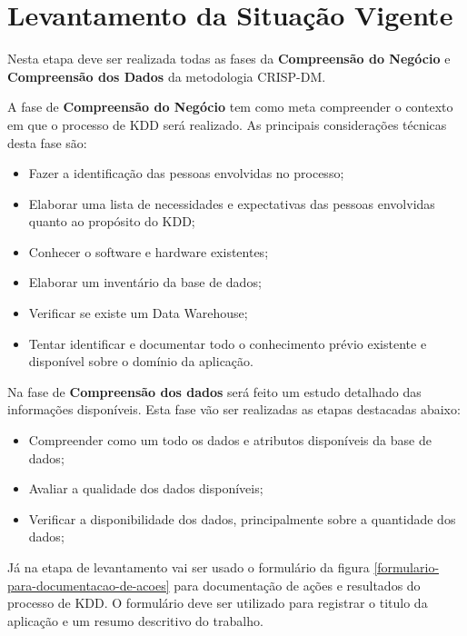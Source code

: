 \documentclass[diss-proposta,nocipinfo]{texufpel}
\begin{document}
\section{Levantamento da Situação Vigente}
\label{sec:levantamento-da-situacao-vigente}

Nesta etapa deve ser realizada todas as fases da \textbf{Compreensão do Negócio} e \textbf{Compreensão dos Dados} da metodologia CRISP-DM. 

A fase de \textbf{Compreensão do Negócio} tem como meta compreender o contexto em que o processo de KDD será realizado. As principais considerações técnicas desta fase são:
\begin{itemize}
\item Fazer a identificação das pessoas envolvidas no processo;
\item Elaborar uma lista de necessidades e expectativas das pessoas envolvidas quanto ao propósito do KDD;
\item Conhecer o software e hardware existentes;
\item Elaborar um inventário da base de dados;
\item Verificar se existe um Data Warehouse;
\item Tentar identificar e documentar todo o conhecimento prévio existente e disponível sobre o domínio da aplicação.
\end{itemize}

Na fase de \textbf{Compreensão dos dados} será feito um estudo detalhado das informações disponíveis. Esta fase vão ser realizadas as etapas destacadas abaixo:
\begin{itemize}
\item Compreender como um todo os dados e atributos disponíveis da base de dados;
\item Avaliar a qualidade dos dados disponíveis;
\item Verificar a disponibilidade dos dados, principalmente sobre a quantidade dos dados;
\end{itemize}

Já na etapa de levantamento vai ser usado o formulário da figura \ref{formulario-para-documentacao-de-acoes} para documentação de ações e resultados do processo de KDD. O formulário deve ser utilizado para registrar o titulo da aplicação e um resumo descritivo do trabalho.


\end{document}
